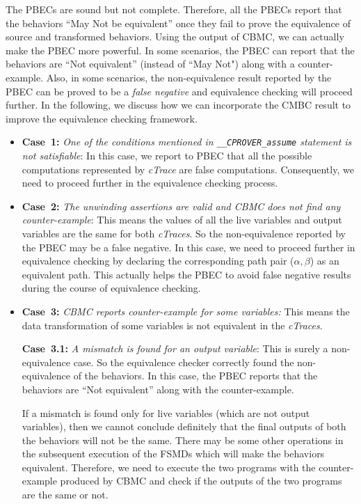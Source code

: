 The PBECs are sound but not complete. Therefore, all the PBECs 
report that the behaviors ``May Not be equivalent'' once
they fail to prove the equivalence of source and transformed behaviors. Using
the output of CBMC, we can actually make the PBEC more
powerful. In some scenarios, the PBEC can report that the
behaviors are ``Not equivalent'' (instead of ``May Not") along with a
counter-example. Also, in some scenarios, the non-equivalence result reported by
the PBEC can be proved to be a \textit{false negative} and equivalence
checking will proceed further. In the following, we discuss how we can
incorporate the CMBC result to improve the equivalence checking framework.
 \begin{itemize}
  \item {\textbf{Case~1:} \it One of the conditions mentioned in 
  \texttt{\_\_CPROVER\_assume} statement is not 
  satisfiable}: In this case, we report to PBEC that all
  the possible computations represented by \textit{cTrace} are false 
  computations.  Consequently, we need to proceed further in the 
  equivalence checking process.
 \item {\textbf{Case~2:} \it The unwinding assertions are valid and CBMC 
 does not find any counter-example}: This means the values of all the live 
 variables and output variables are the same for both \textit{cTraces}. So the non-equivalence 
 reported by the PBEC may be a false negative. In this case, we need to proceed 
 further in equivalence checking by declaring the corresponding path pair 
 ($\alpha,\beta$) as an equivalent path. This actually helps the PBEC to avoid 
 false negative results during the course of equivalence checking.
 \item {\textbf{Case~3:} \it CBMC reports counter-example for some variables:} 
 This means the data transformation of some variables is not equivalent 
 in the \textit{cTraces}. 
 
 {\textbf{Case~3.1:} \it A mismatch is found for an output variable}:   
 This is surely a non-equivalence case. So the equivalence checker correctly 
 found the non-equivalence of the behaviors. In this case, the PBEC 
 reports that the behaviors are ``Not equivalent'' along with the 
 counter-example. 

 If a mismatch is found only for live variables (which are 
 not output variables), then we cannot conclude definitely that the final 
 outputs of both the behaviors will not be the same. There may be some other 
 operations in the subsequent execution of the FSMDs which will make the 
 behaviors equivalent. Therefore, we need to execute the two programs with the 
 counter-example produced by CBMC and check if the outputs of the two 
 programs are the same or not. 
 

\end{itemize}
